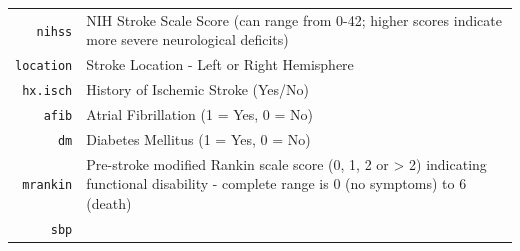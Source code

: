 \documentclass[]{book}
\theoremstyle{definition}
\theoremstyle{definition}
\theoremstyle{definition}
\theoremstyle{remark}
\begin{document}
\begin{longtable}[]{@{}rl@{}}
\begin{minipage}[t]{0.16\columnwidth}\raggedleft\strut
\texttt{nihss}\strut
\end{minipage} & \begin{minipage}[t]{0.55\columnwidth}\raggedright\strut
NIH Stroke Scale Score (can range from 0-42; higher scores indicate more
severe neurological deficits)\strut
\end{minipage}\tabularnewline
\begin{minipage}[t]{0.16\columnwidth}\raggedleft\strut
\texttt{location}\strut
\end{minipage} & \begin{minipage}[t]{0.55\columnwidth}\raggedright\strut
Stroke Location - Left or Right Hemisphere\strut
\end{minipage}\tabularnewline
\begin{minipage}[t]{0.16\columnwidth}\raggedleft\strut
\texttt{hx.isch}\strut
\end{minipage} & \begin{minipage}[t]{0.55\columnwidth}\raggedright\strut
History of Ischemic Stroke (Yes/No)\strut
\end{minipage}\tabularnewline
\begin{minipage}[t]{0.16\columnwidth}\raggedleft\strut
\texttt{afib}\strut
\end{minipage} & \begin{minipage}[t]{0.55\columnwidth}\raggedright\strut
Atrial Fibrillation (1 = Yes, 0 = No)\strut
\end{minipage}\tabularnewline
\begin{minipage}[t]{0.16\columnwidth}\raggedleft\strut
\texttt{dm}\strut
\end{minipage} & \begin{minipage}[t]{0.55\columnwidth}\raggedright\strut
Diabetes Mellitus (1 = Yes, 0 = No)\strut
\end{minipage}\tabularnewline
\begin{minipage}[t]{0.16\columnwidth}\raggedleft\strut
\texttt{mrankin}\strut
\end{minipage} & \begin{minipage}[t]{0.55\columnwidth}\raggedright\strut
Pre-stroke modified Rankin scale score (0, 1, 2 or \textgreater{} 2)
indicating functional disability - complete range is 0 (no symptoms) to
6 (death)\strut
\end{minipage}\tabularnewline
\begin{minipage}[t]{0.16\columnwidth}\raggedleft\strut
\texttt{sbp}\strut
\end{minipage} & \begin{minipage}[t]{0.55\columnwidth}\raggedright\strut

\end{minipage}
\end{longtable}
\end{document}
